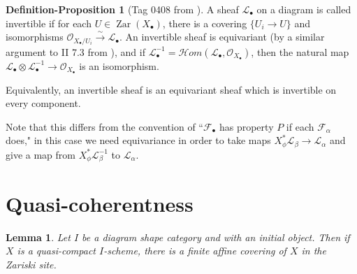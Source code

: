 \documentclass[proquest]{uwthesis}[2014/11/13]
\newtheorem{lemma}[theorem]{Lemma}
\theoremstyle{definition}
\newtheorem{defprop}[theorem]{Definition-Proposition}
\newcommand{\cHom}{\mathcal{H} \textit{om}}
\DeclareMathOperator{\Zar}{Zar}
\newcommand{\FF}{\mathscr{F}}
\newcommand{\LL}{\mathcal{L}}
\newcommand{\OO}{\mathcal{O}}
\begin{document}
\begin{defprop}[Tag 0408 from \cite{stacks}]
	A sheaf $\LL_\bullet$ on a diagram is called invertible if for each $U \in \Zar(X_\bullet)$, there is a covering $\{U_i \rightarrow U\}$ and isomorphisms $\OO_{X_\bullet/U_i} \xrightarrow{\sim} \LL_\bullet$.
	An invertible sheaf is equivariant (by a similar argument to II 7.3 from \cite{Lipman2009}), and if $\LL_\bullet^{-1} = \cHom(\LL_\bullet, \OO_{X_\bullet})$, then the natural map $\LL_\bullet \otimes \LL_\bullet^{-1} \rightarrow \OO_{X_\bullet}$ is an isomorphism.
	
	Equivalently, an invertible sheaf is an equivariant sheaf which is invertible on every component.
\end{defprop}

Note that this differs from the convention of ``$\FF_\bullet$ has property $P$ if each $\FF_\alpha$ does," in this case we need equivariance in order to take maps $X_\phi^* \LL_\beta \rightarrow \LL_\alpha$ and give a map from $X_\phi^* \LL_\beta^{-1}$ to $\LL_\alpha$.

\section{Quasi-coherentness}
	
\begin{lemma}
	\label{lem:affinecover}
	Let $I$ be a diagram shape category and with an initial object.
	Then if $X$ is a quasi-compact $I$-scheme, there is a finite affine covering of $X$ in the Zariski site.
\end{lemma}
\end{document}
